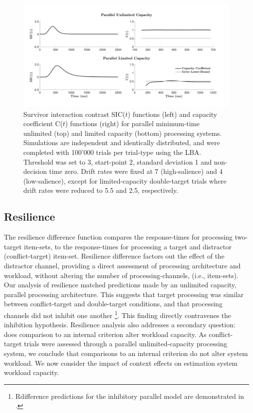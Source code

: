 \begin{figure}[hbt]
\centering \includegraphics[width=\linewidth]{Figures/EstSystems/FIG12JPG.png}
\caption{Survivor interaction contrast SIC($t$) functions (left) and capacity coefficient C($t$) functions (right) for parallel minimum-time unlimited (top) and limited capacity (bottom) processing systems. Simulations are independent and identically distributed, and were completed with 100'000 trials per trial-type using the LBA. Threshold was set to 3, start-point 2, standard deviation 1 and non-decision time zero. Drift rates were fixed at 7 (high-salience) and 4 (low-salience), except for limited-capacity double-target trials where drift rates were reduced to 5.5 and 2.5, respectively.}
\label{fig:LimVsUnlim}
\end{figure}

\subsection{Resilience}
The resilience difference function compares the response-times for processing two-target item-sets, to the response-times for processing a target and distractor (conflict-target) item-set. Resilience difference factors out the effect of the distractor channel, providing a direct assessment of processing architecture and workload, without altering the number of processing-channels, (i.e., item-sets). Our analysis of resilience matched predictions made by an unlimited capacity, parallel processing architecture. This suggests that target processing was similar between conflict-target and double-target conditions, and that processing channels did not inhibit one another \footnote{Rdifference predictions for the inhibitory parallel model are demonstrated in \cite{Little2018mixmodel}.}. This finding directly contravenes the inhibition hypothesis. Resilience analysis also addresses a secondary question: does comparison to an internal criterion alter workload capacity. As conflict-target trials were assessed through a parallel unlimited-capacity processing system, we conclude that comparisons to an internal criterion do not alter system workload. We now consider the impact of context effects on estimation system workload capacity.

